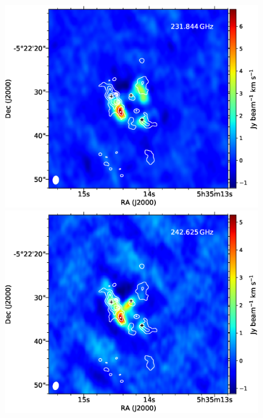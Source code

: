 \begin{figure}[H]
\begin{center}
\begin{minipage}{0.98\textwidth}
\begin{center}
\begin{minipage}{0.48\textwidth}
\begin{center}
\end{center}
\end{minipage}
\end{center}
\end{minipage}
\begin{minipage}{0.98\textwidth} 
\begin{center}
\begin{minipage}{0.48\textwidth}
\begin{center}
\includegraphics[width=0.98\textwidth]{OrionKL/mom0/231.844SV_mom0_3-7.eps}
\end{center}
\end{minipage}
\begin{minipage}{0.48\textwidth}
\begin{center}
\includegraphics[width=0.98\textwidth]{OrionKL/mom0/242.625SV_mom0_3-7.eps}

\end{center}
\end{minipage}
\end{center}
\end{minipage}
\end{center}
\end{figure}
